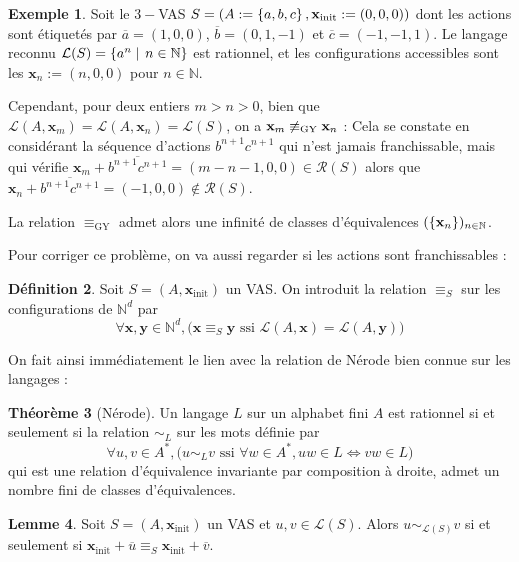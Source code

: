 \documentclass[a4paper,final]{article}
\theoremstyle{definition}
\newtheorem{Theorem}{Théorème}
\newtheorem{Definition}[Theorem]{Définition}
\newtheorem{Lemma}[Theorem]{Lemme}
\newtheorem{Example}[Theorem]{Exemple}
\newcommand{\set}[2]{\left\{#1\mathrel{\left|\vphantom{#1}\vphantom{#2}\right.}#2\right\}}
\newcommand{\os}[1]{\left\{\mathinner{#1}\right\}}
\newcommand{\N}{\ensuremath{\mathbb{N}}}
\newcommand{\lang}{\ensuremath{\mathcal{L}}}
\newcommand{\conf}{\ensuremath{\mathcal{R}}}
\newcommand{\vect}[1]{\ensuremath{\mathbf{#1}}}
\newcommand{\rel}{\ensuremath{\equiv}}
\newcommand{\relGY}{\ensuremath{\equiv_\text{GY}}}
\newcommand{\ssi}{\ensuremath{\text{ ssi }}}
\newcommand{\equivaut}{\ensuremath{\Leftrightarrow}}
\newcommand{\xinit}{\ensuremath{\vect{x}_\text{init}}}
\newcommand{\valeur}[1]{\ensuremath{\overline{#1}}}
\begin{document}
\begin{Example}
Soit le $3-$VAS $S = (A:=\os{a,b,c},\xinit:=(0,0,0))$ dont les actions sont étiquetés par $\valeur{a}=(1,0,0)$, $\valeur{b}=(0,1,-1)$ et $\valeur{c}=(-1,-1,1)$.
Le langage reconnu $\lang(S)=\set{a^n}{n\in\N}$ est rationnel, et les configurations accessibles sont les $\vect{x}_n:=(n,0,0)$ pour $n\in\N$.

Cependant, pour deux entiers $m>n>0$, bien que $\lang(A,\vect{x}_m) =\lang(A,\vect{x}_n) =\lang(S)$, on a $\vect{x}_m \not\relGY \vect{x}_n$ :
Cela se constate en considérant la séquence d'actions $b^{n+1}c^{n+1}$ qui n'est jamais franchissable, mais qui vérifie $\vect{x}_m +\valeur{b^{n+1}c^{n+1}} = (m-n-1,0,0)\in \conf(S)$ alors que $\vect{x}_n +\valeur{b^{n+1}c^{n+1}} = (-1,0,0)\notin \conf(S)$.

La relation $\relGY$ admet alors une infinité de classes d'équivalences $(\os{\vect{x}_n})_{n\in\N}$.
\end{Example}

Pour corriger ce problème, on va aussi regarder si les actions sont franchissables :

\begin{Definition}
Soit $S=(A,\xinit)$ un VAS. On introduit la relation $\rel_S$ sur les configurations de $\N^d$ par
$$\forall \vect{x},\vect{y}\in\N^d, \Big(
\vect{x} \rel_S \vect{y} \ssi \lang(A,\vect{x}) = \lang(A,\vect{y}) \Big)$$
\end{Definition}


On fait ainsi immédiatement le lien avec la relation de Nérode bien connue sur les langages :

\begin{Theorem}[Nérode]
    Un langage $L$ sur un alphabet fini $A$ est rationnel si et seulement si la relation $\sim_L$ sur les mots définie par
    $$\forall u,v\in A^\ast, \Big( u\sim_L v \ssi \forall w\in A^\ast, uw\in L \equivaut vw\in L \Big)$$
    qui est une relation d'équivalence invariante par composition à droite, 
    admet un nombre fini de classes d'équivalences.
\end{Theorem}

\begin{Lemma}
    Soit $S=(A,\xinit)$ un VAS et $u,v\in\lang(S)$.
    Alors $u\sim_{\lang(S)}v$ si et seulement si $\xinit +\valeur{u} \rel_S \xinit +\valeur{v}$.
\end{Lemma}
\end{document}
